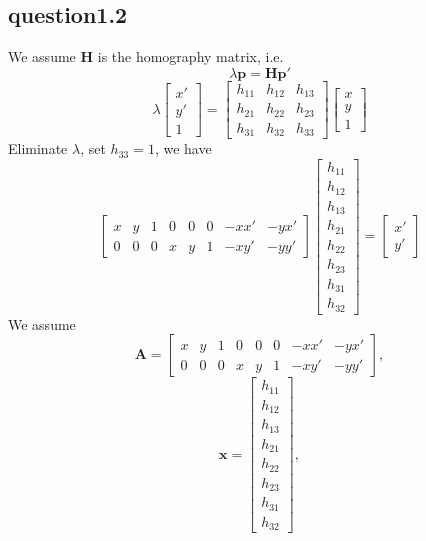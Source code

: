 \documentclass[a4paper,UTF8]{article}
\numberwithin{equation}{section}
\begin{document}
\subsection{question1.2}
We assume $\textbf{H}$ is the homography matrix, i.e.
\begin{equation}
	\lambda \textbf{p}=\textbf{H}\textbf{p}'
\end{equation}
\begin{equation}
	\lambda\begin{bmatrix}
		x' \\
		y' \\
		1
	\end{bmatrix}
	=
	\begin{bmatrix}
		h_{11} & h_{12} & h_{13} \\
		h_{21} & h_{22} & h_{23} \\
		h_{31} & h_{32} & h_{33}
	\end{bmatrix}
	\begin{bmatrix}
		x \\
		y \\
		1
	\end{bmatrix}
\end{equation}
Eliminate $\lambda$, set $h_{33}=1$, we have
\begin{equation}
	\begin{bmatrix}
		x & y & 1 & 0 & 0 & 0 & -xx' & -yx' \\
		0 & 0 & 0 & x & y & 1 & -xy' & -yy'
	\end{bmatrix}\begin{bmatrix}
		h_{11} \\
		h_{12} \\
		h_{13} \\
		h_{21} \\
		h_{22} \\
		h_{23} \\
		h_{31} \\
		h_{32}
	\end{bmatrix}=\begin{bmatrix}
		x' \\
		y'
	\end{bmatrix}
\end{equation}
We assume $$\textbf{A}=\begin{bmatrix}
		x & y & 1 & 0 & 0 & 0 & -xx' & -yx' \\
		0 & 0 & 0 & x & y & 1 & -xy' & -yy'
	\end{bmatrix},$$
$$\textbf{x}=\begin{bmatrix}
		h_{11} \\
		h_{12} \\
		h_{13} \\
		h_{21} \\
		h_{22} \\
		h_{23} \\
		h_{31} \\
		h_{32}
	\end{bmatrix},$$
\end{document}
